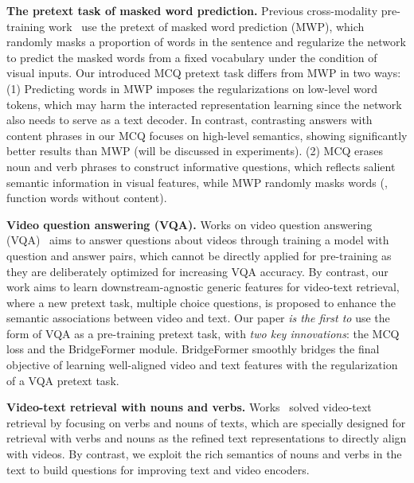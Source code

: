 \documentclass[10pt,twocolumn,letterpaper]{article}
\renewcommand{\paragraph}[1]{\vspace{1.25mm}\noindent\textbf{#1}}
\begin{document}
\paragraph{The pretext task of masked word prediction.}
Previous cross-modality pre-training work~\cite{vilt,univl,actbert} use the pretext of masked word prediction (MWP), which randomly masks a proportion of words in the sentence and regularize the network to predict the masked words from a fixed vocabulary under the condition of visual inputs. 
Our introduced MCQ pretext task differs from MWP in two ways: 
(1) Predicting words in MWP imposes the regularizations on low-level word tokens, which may harm the interacted representation learning since the network also needs to serve as a text decoder. In contrast, contrasting answers with content phrases in our MCQ focuses on high-level semantics, showing significantly better results than MWP (will be discussed in experiments).
(2) MCQ erases noun and verb phrases to construct informative questions, which reflects salient semantic information in visual features, while MWP randomly masks words (\eg, function words without content).

\paragraph{Video question answering (VQA).}
Works on video question answering (VQA)~\cite{qa1,qa2,qa3,qa4} aims to answer questions about videos through training a model with question and answer pairs, which cannot be directly applied for pre-training as they are deliberately optimized for increasing VQA accuracy. By contrast, our work aims to learn downstream-agnostic generic features for video-text retrieval, where a new pretext task, multiple choice questions, is proposed to enhance the semantic associations between video and text. Our paper \textit{is the first to} use the form of VQA as a pre-training pretext task, with \textit{two key innovations}: the MCQ loss and the BridgeFormer module. BridgeFormer smoothly bridges the final objective of learning well-aligned video and text features with the regularization of a VQA pretext task.

\paragraph{Video-text retrieval with nouns and verbs.}
Works~\cite{re1,re2,re3,re4} solved video-text retrieval by focusing on verbs and nouns of texts, which are specially designed for retrieval with verbs and nouns as the refined text representations to directly align with videos. By contrast, we  exploit the rich semantics of nouns and verbs in the text to build questions for improving text and video encoders.
\end{document}
